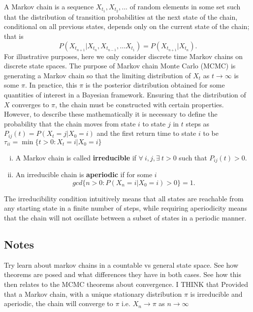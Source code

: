 A Markov chain is a sequence $X_{t_1}, X_{t_2}, ...$ of random elements in some set such that the distribution of transition probabilities at the next state of the chain, conditional on all previous states, depends only on the current state of the chain; that is 
    \begin{equation}
        P(X_{t_{n+1}}|X_{t_n},X_{t_{n-1}},\ldots X_{t_1}) = P(X_{t_{n+1}}|X_{t_n}).
    \end{equation}
For illustrative purposes, here we only consider discrete time Markov chains on discrete state spaces. 
The purpose of Markov chain Monte Carlo (MCMC) is generating a Markov chain so that the limiting distribution of $X_t$ as $t\rightarrow\infty$ is some $\pi$. 
In practice, this $\pi$ is the posterior distribution obtained for some quantities of interest in a Bayesian framework. 
Ensuring that the distribution of $X$ converges to $\pi$, the chain must be constructed with certain properties. However, to describe these mathematically it is necessary to define the probability that the chain moves from state $i$ to state $j$ in $t$ steps as $ P_{ij}(t) = P(X_t = j | X_0 = i)$
and the first return time to state $i$ to be $\tau_{ii} = \min\{t>0:X_t = i|X_0 = i\}$
    \begin{enumerate}[(i)]
        \item A Markov chain is called \textbf{irreducible} if $\forall~i,j, \exists~t > 0$ such that $P_{ij}(t) > 0$.
        \item An irreducible chain is \textbf{aperiodic} if for some $i$
            $$gcd\{n>0:P(X_n = i|X_0 = i) > 0\} =1. $$
    \end{enumerate}
The irreducibility condition intuitively means that all states are reachable from any starting state in a finite number of steps, while requiring aperiodicity means that the chain will not oscillate between a subset of states in a periodic manner. 


\subsection{Notes}
    Try learn about markov chains in a countable vs general state space. See how theorems are posed and what differences they have in both cases. See how this then relates to the MCMC theorems about convergence. I THINK that Provided that a Markov chain, with a unique stationary distribution $\pi$ is irreducible and aperiodic, the chain will converge to $\pi$ i.e. $X_n \rightarrow \pi$ as $n\rightarrow\infty$